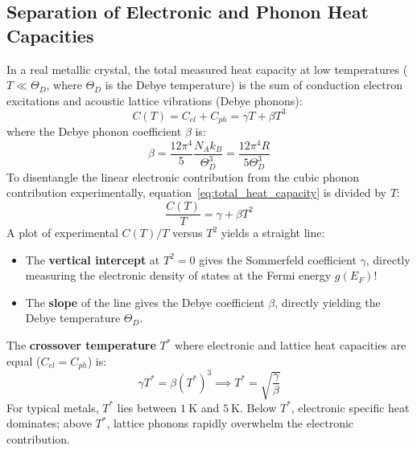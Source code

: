 \documentclass[11pt,a4paper]{article}
\begin{document}
\subsection{Separation of Electronic and Phonon Heat Capacities}
In a real metallic crystal, the total measured heat capacity at low temperatures ($T \ll \Theta_D$, where $\Theta_D$ is the Debye temperature) is the sum of conduction electron excitations and acoustic lattice vibrations (Debye phonons):
\begin{equation}
C(T) = C_{el} + C_{ph} = \gamma T + \beta T^3
\label{eq:total_heat_capacity}
\end{equation}
where the Debye phonon coefficient $\beta$ is:
\begin{equation}
\beta = \frac{12\pi^4}{5}\frac{N_A k_B}{\Theta_D^3} = \frac{12\pi^4 R}{5\Theta_D^3}
\label{eq:debye_beta}
\end{equation}
To disentangle the linear electronic contribution from the cubic phonon contribution experimentally, equation~\eqref{eq:total_heat_capacity} is divided by $T$:
\begin{equation}
\boxed{\frac{C(T)}{T} = \gamma + \beta T^2}
\label{eq:c_over_t_plot}
\end{equation}
A plot of experimental $C(T)/T$ versus $T^2$ yields a straight line:
\begin{itemize}
    \item The \textbf{vertical intercept} at $T^2 = 0$ gives the Sommerfeld coefficient $\gamma$, directly measuring the electronic density of states at the Fermi energy $g(E_F)$!
    \item The \textbf{slope} of the line gives the Debye coefficient $\beta$, directly yielding the Debye temperature $\Theta_D$.
\end{itemize}
The \textbf{crossover temperature} $T^*$ where electronic and lattice heat capacities are equal ($C_{el} = C_{ph}$) is:
\begin{equation}
\gamma T^* = \beta (T^*)^3 \implies \boxed{T^* = \sqrt{\frac{\gamma}{\beta}}}
\label{eq:crossover_temp}
\end{equation}
For typical metals, $T^*$ lies between $1\ \mathrm{K}$ and $5\ \mathrm{K}$. Below $T^*$, electronic specific heat dominates; above $T^*$, lattice phonons rapidly overwhelm the electronic contribution.
\end{document}
